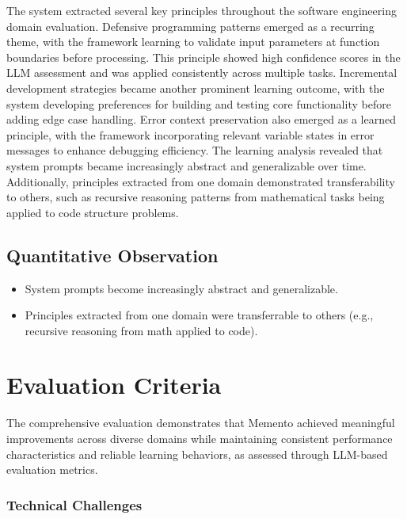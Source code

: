 \documentclass[10pt,a4paper,twocolumn]{article}
\begin{document}
The system extracted several key principles throughout the software engineering domain evaluation. Defensive programming patterns emerged as a recurring theme, with the framework learning to validate input parameters at function boundaries before processing. This principle showed high confidence scores in the LLM assessment and was applied consistently across multiple tasks. \newline
Incremental development strategies became another prominent learning outcome, with the system developing preferences for building and testing core functionality before adding edge case handling. Error context preservation also emerged as a learned principle, with the framework incorporating relevant variable states in error messages to enhance debugging efficiency. \newline
The learning analysis revealed that system prompts became increasingly abstract and generalizable over time. Additionally, principles extracted from one domain demonstrated transferability to others, such as recursive reasoning patterns from mathematical tasks being applied to code structure problems.






\subsection{Quantitative Observation}


\begin{itemize}
    \item System prompts become increasingly abstract and generalizable.
    \item Principles extracted from one domain were transferrable to others (e.g., recursive reasoning from math applied to code).
\end{itemize}







\section{Evaluation Criteria} 

The comprehensive evaluation demonstrates that Memento achieved meaningful improvements across diverse domains while maintaining consistent performance characteristics and reliable learning behaviors, as assessed through LLM-based evaluation metrics.


\subsubsection{Technical Challenges}
\end{document}
